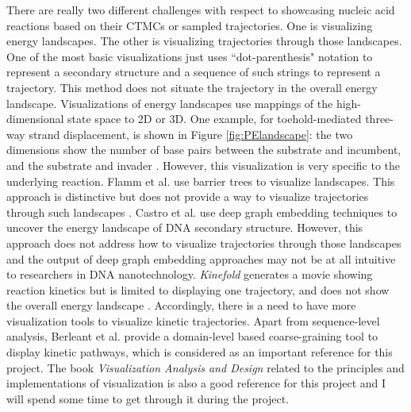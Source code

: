 \documentclass{article}
\begin{document}
There are really two different challenges with respect to showcasing nucleic acid reactions based on their CTMCs or sampled trajectories. One is visualizing energy landscapes. The other is visualizing trajectories through those landscapes. One of the most basic visualizations just uses ``dot-parenthesis" notation to represent a secondary structure and a sequence of such strings to represent a trajectory. This method does not situate the trajectory in the overall energy landscape. Visualizations of energy landscapes use mappings of the high-dimensional state space to 2D or 3D. One example, for toehold-mediated three-way strand displacement, is shown in Figure \ref{fig:PElandscape}: the two dimensions show the number of base pairs between the substrate and incumbent, and the substrate and invader \cite{MachinekThreeway}. However, this visualization is very specific to the underlying reaction. Flamm et al. use barrier trees to visualize landscapes. This approach is distinctive but does not provide a way to visualize trajectories through such landscapes \cite{barriertrees,Badelt}. Castro et al. \cite{deepgraph} use deep graph embedding techniques to uncover the energy landscape of DNA secondary structure. However, this approach does not address how to visualize trajectories through those landscapes and the output of deep graph embedding approaches may not be at all intuitive to researchers in DNA nanotechnology. \textit{Kinefold} generates a movie showing reaction kinetics but is limited to displaying one trajectory, and does not show the overall energy landscape \cite{kinefold}. Accordingly, there is a need to have more visualization tools to visualize kinetic trajectories. Apart from sequence-level analysis, Berleant et al. \cite{domaincoarse} provide a domain-level based coarse-graining tool to display kinetic pathways, which is considered as an important reference for this project. The book \textit{Visualization Analysis and Design} \cite{tamara} related to the principles and implementations of visualization is also a good reference for this project and I will spend some time to get through it during the project.

\end{document}
